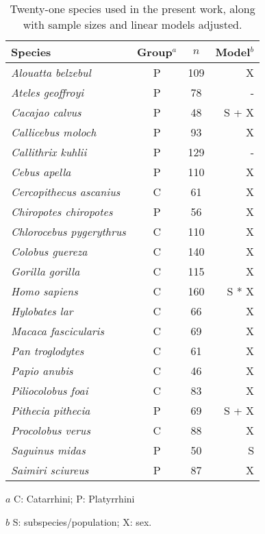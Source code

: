 \begin{table}[t]
  \centering
  \begin{threeparttable}
    \caption{Twenty-one species used in the present work, along with sample sizes and linear models adjusted. \label{tab:modcomp_otu}}
    \begin{tabular}{lccr}
        \toprule
        Species & Group$^a$ & $n$ & Model$^b$ \\ 
      \midrule
        \emph{Alouatta belzebul} & P & 109 & X \\ 
        \emph{Ateles geoffroyi} & P & 78 & - \\ 
        \emph{Cacajao calvus} & P & 48 & S + X \\ 
        \emph{Callicebus moloch} & P & 93 & X \\ 
        \emph{Callithrix kuhlii} & P & 129 & - \\ 
        \emph{Cebus apella} & P & 110 & X \\ 
        \emph{Cercopithecus ascanius} & C & 61 & X \\ 
        \emph{Chiropotes chiropotes} & P & 56 & X \\ 
        \emph{Chlorocebus pygerythrus} & C & 110 & X \\ 
        \emph{Colobus guereza} & C & 140 & X \\ 
        \emph{Gorilla gorilla} & C & 115 & X \\ 
        \emph{Homo sapiens} & C & 160 & S * X \\ 
        \emph{Hylobates lar} & C & 66 & X \\ 
        \emph{Macaca fascicularis} & C & 69 & X \\ 
        \emph{Pan troglodytes} & C & 61 & X \\ 
        \emph{Papio anubis} & C & 46 & X \\ 
        \emph{Piliocolobus foai} & C & 83 & X \\ 
        \emph{Pithecia pithecia} & P & 69 & S + X \\ 
        \emph{Procolobus verus} & C & 88 & X \\ 
        \emph{Saguinus midas} & P & 50 & S \\ 
        \emph{Saimiri sciureus} & P & 87 & X \\ 
      \bottomrule
    \end{tabular}
      \begin{tablenotes}
        \footnotesize
        {
        \item[$a$] C: Catarrhini; P: Platyrrhini
        \item[$b$] S: subspecies/population; X: sex.
        }
      \end{tablenotes}
    \end{threeparttable}
  \end{table}
